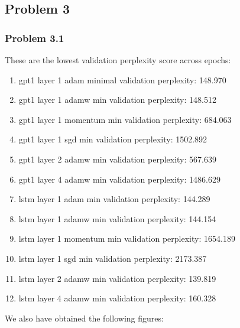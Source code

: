 \documentclass[12pt]{article}
\theoremstyle{definition}
\begin{document}
\subsection*{Problem 3}
\subsubsection*{Problem 3.1}

These are the lowest validation perplexity score across epochs:
\begin{enumerate}
  \item gpt1 layer 1 adam minimal validation perplexity: 148.970
  \item gpt1 layer 1 adamw min validation perplexity: 148.512
  \item gpt1 layer 1 momentum min validation perplexity: 684.063
  \item gpt1 layer 1 sgd min validation perplexity: 1502.892
  \item gpt1 layer 2 adamw min validation perplexity: 567.639
  \item gpt1 layer 4 adamw min validation perplexity: 1486.629
  \item lstm layer 1 adam min validation perplexity: 144.289
  \item lstm layer 1 adamw min validation perplexity: 144.154
  \item lstm layer 1 momentum min validation perplexity: 1654.189
  \item lstm layer 1 sgd min validation perplexity: 2173.387
  \item lstm layer 2 adamw min validation perplexity: 139.819
  \item lstm layer 4 adamw min validation perplexity: 160.328
\end{enumerate}

We also have obtained the following figures:
\end{document}
